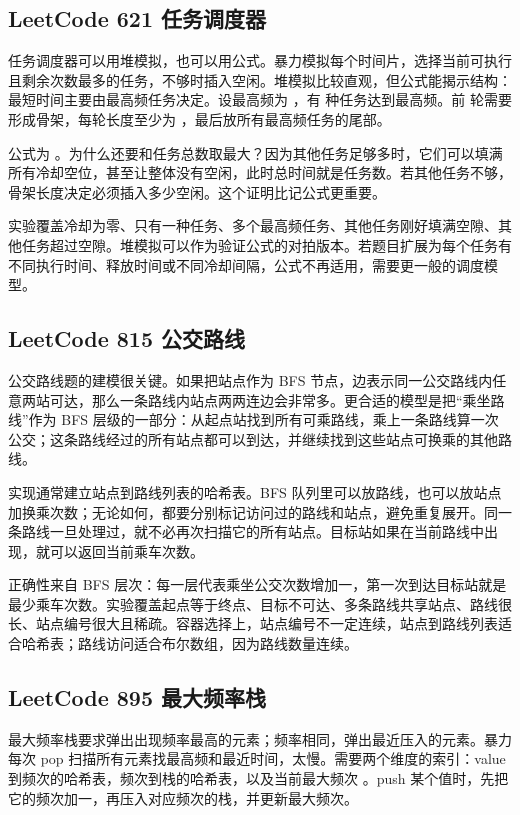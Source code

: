 \subsection{LeetCode 621 任务调度器}

任务调度器可以用堆模拟，也可以用公式。暴力模拟每个时间片，选择当前可执行且剩余次数最多的任务，不够时插入空闲。堆模拟比较直观，但公式能揭示结构：最短时间主要由最高频任务决定。设最高频为 ，有  种任务达到最高频。前  轮需要形成骨架，每轮长度至少为 ，最后放所有最高频任务的尾部。

公式为 。为什么还要和任务总数取最大？因为其他任务足够多时，它们可以填满所有冷却空位，甚至让整体没有空闲，此时总时间就是任务数。若其他任务不够，骨架长度决定必须插入多少空闲。这个证明比记公式更重要。

实验覆盖冷却为零、只有一种任务、多个最高频任务、其他任务刚好填满空隙、其他任务超过空隙。堆模拟可以作为验证公式的对拍版本。若题目扩展为每个任务有不同执行时间、释放时间或不同冷却间隔，公式不再适用，需要更一般的调度模型。

\subsection{LeetCode 815 公交路线}

公交路线题的建模很关键。如果把站点作为 BFS 节点，边表示同一公交路线内任意两站可达，那么一条路线内站点两两连边会非常多。更合适的模型是把“乘坐路线”作为 BFS 层级的一部分：从起点站找到所有可乘路线，乘上一条路线算一次公交；这条路线经过的所有站点都可以到达，并继续找到这些站点可换乘的其他路线。

实现通常建立站点到路线列表的哈希表。BFS 队列里可以放路线，也可以放站点加换乘次数；无论如何，都要分别标记访问过的路线和站点，避免重复展开。同一条路线一旦处理过，就不必再次扫描它的所有站点。目标站如果在当前路线中出现，就可以返回当前乘车次数。

正确性来自 BFS 层次：每一层代表乘坐公交次数增加一，第一次到达目标站就是最少乘车次数。实验覆盖起点等于终点、目标不可达、多条路线共享站点、路线很长、站点编号很大且稀疏。容器选择上，站点编号不一定连续，站点到路线列表适合哈希表；路线访问适合布尔数组，因为路线数量连续。

\subsection{LeetCode 895 最大频率栈}

最大频率栈要求弹出出现频率最高的元素；频率相同，弹出最近压入的元素。暴力每次 pop 扫描所有元素找最高频和最近时间，太慢。需要两个维度的索引：value 到频次的哈希表，频次到栈的哈希表，以及当前最大频次 。push 某个值时，先把它的频次加一，再压入对应频次的栈，并更新最大频次。

